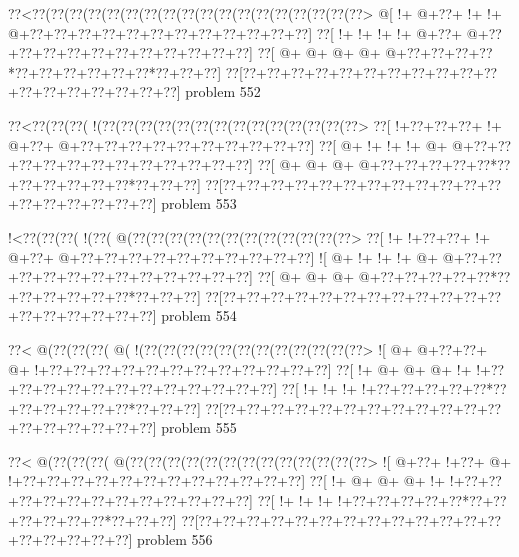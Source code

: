 \vbox{\vbox{\goo
\0??<\0??(\0??(\0??(\0??(\0??(\0??(\0??(\0??(\0??(\0??(\0??(\0??(\0??(\0??(\0??(\0??(\0??(\0??>
\- @[\- !+\- @+\0??+\- !+\- !+\- @+\0??+\0??+\0??+\0??+\0??+\0??+\0??+\0??+\0??+\0??+\0??+\0??]
\0??[\- !+\- !+\- !+\- !+\- @+\0??+\- @+\0??+\0??+\0??+\0??+\0??+\0??+\0??+\0??+\0??+\0??+\0??]
\0??[\- @+\- @+\- @+\- @+\- @+\0??+\0??+\0??+\0??*\0??+\0??+\0??+\0??+\0??+\0??*\0??+\0??+\0??]
\0??[\0??+\0??+\0??+\0??+\0??+\0??+\0??+\0??+\0??+\0??+\0??+\0??+\0??+\0??+\0??+\0??+\0??+\0??]
}
\hfil problem 552\hfil\break
}



\vbox{\vbox{\goo
\0??<\0??(\0??(\0??(\- !(\0??(\0??(\0??(\0??(\0??(\0??(\0??(\0??(\0??(\0??(\0??(\0??(\0??(\0??>
\0??[\- !+\0??+\0??+\0??+\- !+\- @+\0??+\- @+\0??+\0??+\0??+\0??+\0??+\0??+\0??+\0??+\0??+\0??]
\0??[\- @+\- !+\- !+\- !+\- @+\- @+\0??+\0??+\0??+\0??+\0??+\0??+\0??+\0??+\0??+\0??+\0??+\0??]
\0??[\- @+\- @+\- @+\- @+\0??+\0??+\0??+\0??+\0??*\0??+\0??+\0??+\0??+\0??+\0??*\0??+\0??+\0??]
\0??[\0??+\0??+\0??+\0??+\0??+\0??+\0??+\0??+\0??+\0??+\0??+\0??+\0??+\0??+\0??+\0??+\0??+\0??]
}
\hfil problem 553\hfil\break
}



\vbox{\vbox{\goo
\- !<\0??(\0??(\0??(\- !(\0??(\- @(\0??(\0??(\0??(\0??(\0??(\0??(\0??(\0??(\0??(\0??(\0??(\0??>
\0??[\- !+\- !+\0??+\0??+\- !+\- @+\0??+\- @+\0??+\0??+\0??+\0??+\0??+\0??+\0??+\0??+\0??+\0??]
\- ![\- @+\- !+\- !+\- !+\- @+\- @+\0??+\0??+\0??+\0??+\0??+\0??+\0??+\0??+\0??+\0??+\0??+\0??]
\0??[\- @+\- @+\- @+\- @+\0??+\0??+\0??+\0??+\0??*\0??+\0??+\0??+\0??+\0??+\0??*\0??+\0??+\0??]
\0??[\0??+\0??+\0??+\0??+\0??+\0??+\0??+\0??+\0??+\0??+\0??+\0??+\0??+\0??+\0??+\0??+\0??+\0??]
}
\hfil problem 554\hfil\break
}



\vbox{\vbox{\goo
\0??<\- @(\0??(\0??(\0??(\- @(\- !(\0??(\0??(\0??(\0??(\0??(\0??(\0??(\0??(\0??(\0??(\0??(\0??>
\- ![\- @+\- @+\0??+\0??+\- @+\- !+\0??+\0??+\0??+\0??+\0??+\0??+\0??+\0??+\0??+\0??+\0??+\0??]
\0??[\- !+\- @+\- @+\- @+\- !+\- !+\0??+\0??+\0??+\0??+\0??+\0??+\0??+\0??+\0??+\0??+\0??+\0??]
\0??[\- !+\- !+\- !+\- !+\0??+\0??+\0??+\0??+\0??*\0??+\0??+\0??+\0??+\0??+\0??*\0??+\0??+\0??]
\0??[\0??+\0??+\0??+\0??+\0??+\0??+\0??+\0??+\0??+\0??+\0??+\0??+\0??+\0??+\0??+\0??+\0??+\0??]
}
\hfil problem 555\hfil\break
}



\vbox{\vbox{\goo
\0??<\- @(\0??(\0??(\0??(\- @(\0??(\0??(\0??(\0??(\0??(\0??(\0??(\0??(\0??(\0??(\0??(\0??(\0??>
\- ![\- @+\0??+\- !+\0??+\- @+\- !+\0??+\0??+\0??+\0??+\0??+\0??+\0??+\0??+\0??+\0??+\0??+\0??]
\0??[\- !+\- @+\- @+\- @+\- !+\- !+\0??+\0??+\0??+\0??+\0??+\0??+\0??+\0??+\0??+\0??+\0??+\0??]
\0??[\- !+\- !+\- !+\- !+\0??+\0??+\0??+\0??+\0??*\0??+\0??+\0??+\0??+\0??+\0??*\0??+\0??+\0??]
\0??[\0??+\0??+\0??+\0??+\0??+\0??+\0??+\0??+\0??+\0??+\0??+\0??+\0??+\0??+\0??+\0??+\0??+\0??]
}
\hfil problem 556\hfil\break
}



